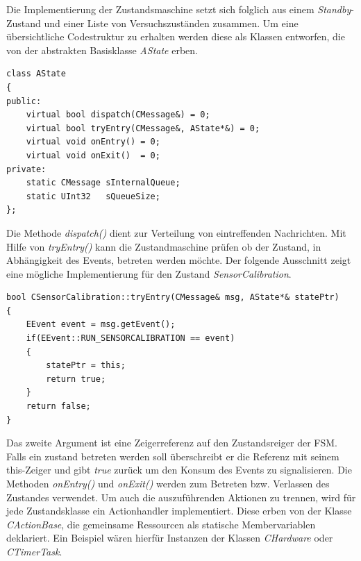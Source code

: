 Die Implementierung der Zustandsmaschine setzt sich folglich aus einem \textit{Standby}-Zustand und einer Liste von Versuchszuständen zusammen. Um eine übersichtliche Codestruktur zu erhalten werden diese als Klassen entworfen, die von der abstrakten Basisklasse \textit{AState} erben.
\begin{lstlisting}[caption={Angepasste Implementierung der abstrakten Zustandsklasse},captionpos=b]
class AState
{
public:
	virtual bool dispatch(CMessage&) = 0;
	virtual bool tryEntry(CMessage&, AState*&) = 0;
	virtual void onEntry() = 0;
	virtual void onExit()  = 0;
private:
	static CMessage sInternalQueue;
	static UInt32   sQueueSize;
};
\end{lstlisting}
Die Methode \textit{dispatch()} dient zur Verteilung von eintreffenden Nachrichten. Mit Hilfe von \textit{tryEntry()} kann die Zustandmaschine prüfen ob der Zustand, in Abhängigkeit des Events, betreten werden möchte. Der folgende Ausschnitt zeigt eine mögliche Implementierung für den Zustand \textit{SensorCalibration}.
\begin{lstlisting}[caption={Beispielhafte Definition der Methode \textit{tryEntry()}},captionpos=b]
bool CSensorCalibration::tryEntry(CMessage& msg, AState*& statePtr)
{
	EEvent event = msg.getEvent();
	if(EEvent::RUN_SENSORCALIBRATION == event)
	{
		statePtr = this;
		return true;
	}
	return false;
}
\end{lstlisting}
Das zweite Argument ist eine Zeigerreferenz auf den Zustandsreiger der FSM. Falls ein zustand betreten werden soll überschreibt er die Referenz mit seinem this-Zeiger und gibt \textit{true} zurück um den Konsum des Events zu signalisieren. Die Methoden \textit{onEntry()} und \textit{onExit()} werden zum Betreten bzw. Verlassen des Zustandes verwendet. Um auch die auszuführenden Aktionen zu trennen, wird für jede Zustandsklasse ein Actionhandler implementiert. Diese erben von der Klasse \textit{CActionBase}, die gemeinsame Ressourcen als statische Membervariablen deklariert. Ein Beispiel wären hierfür Instanzen der Klassen \textit{CHardware} oder \textit{CTimerTask}.

